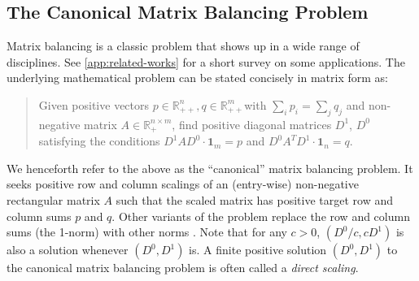 \subsection{The Canonical Matrix Balancing Problem}
Matrix balancing is a classic problem that shows up in a wide range of disciplines. See \cref{app:related-works} for a short survey on some applications. 
The underlying mathematical problem can be stated concisely in matrix form as:
\begin{quote} 
Given positive vectors $p \in \mathbb{R}_{++}^n,q \in \mathbb{R}_{++}^m$with $\sum_i p_i=\sum_j q_j$ and non-negative matrix $A\in \mathbb{R}_+^{n\times m}$, find positive diagonal matrices 
$D^{1}$, $D^{0}$ satisfying the conditions $D^{1}AD^{0}\cdot\mathbf{1}_m=p$
and $D^{0}A^{T}D^{1}\cdot\mathbf{1}_n=q$.\end{quote}
We henceforth refer to the above as the ``canonical'' matrix balancing problem. It seeks positive row and column scalings of an (entry-wise) non-negative rectangular matrix $A$ such that the scaled matrix has positive target row and column sums $p$ and $q$. Other variants of the problem replace the row and column sums (the 1-norm) with other norms \citep{bauer1963optimally,ruiz2001scaling}. Note that for any $c>0$, $(D^0/c,cD^1)$ 
 is also a solution whenever $(D^0,D^1)$ is. A finite positive solution $(D^{0},D^{1})$ to the canonical matrix balancing problem is often called a \emph{direct scaling}.

